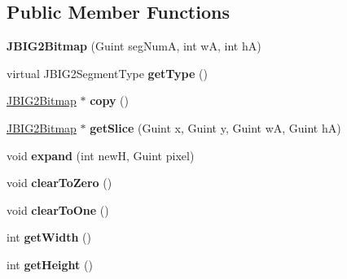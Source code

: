 \subsection*{Public Member Functions}
\begin{DoxyCompactItemize}
\item 
\mbox{\label{class_j_b_i_g2_bitmap_af7a63e73c35e3c62fd77ffe5ddb1dccf}} 
{\bfseries J\+B\+I\+G2\+Bitmap} (Guint seg\+NumA, int wA, int hA)
\item 
\mbox{\label{class_j_b_i_g2_bitmap_ab26ae7c1ba910992c633dd830eee172b}} 
virtual J\+B\+I\+G2\+Segment\+Type {\bfseries get\+Type} ()
\item 
\mbox{\label{class_j_b_i_g2_bitmap_a2f13c130eb777b512c1c8bd844850c84}} 
\hyperlink{class_j_b_i_g2_bitmap}{J\+B\+I\+G2\+Bitmap} $\ast$ {\bfseries copy} ()
\item 
\mbox{\label{class_j_b_i_g2_bitmap_ae009f77d8b4d947d85b9000397bce9d7}} 
\hyperlink{class_j_b_i_g2_bitmap}{J\+B\+I\+G2\+Bitmap} $\ast$ {\bfseries get\+Slice} (Guint x, Guint y, Guint wA, Guint hA)
\item 
\mbox{\label{class_j_b_i_g2_bitmap_aae376357707fb8fe0b6cfecb5cfea193}} 
void {\bfseries expand} (int newH, Guint pixel)
\item 
\mbox{\label{class_j_b_i_g2_bitmap_aa356e2e6bb07cc27b7e5f3c9e7e82e1a}} 
void {\bfseries clear\+To\+Zero} ()
\item 
\mbox{\label{class_j_b_i_g2_bitmap_a0dfebae8091b60f4ec7b63155d2b1bab}} 
void {\bfseries clear\+To\+One} ()
\item 
\mbox{\label{class_j_b_i_g2_bitmap_a7248a97edefd99ddb147380b2b9791e9}} 
int {\bfseries get\+Width} ()
\item 
\mbox{\label{class_j_b_i_g2_bitmap_a7b5fb0a7eb61f5d340dde31acf8c62fb}} 
int {\bfseries get\+Height} ()
\item 
\mbox{\label{class_j_b_i_g2_bitmap_a39618e516b3dfe7de8378a3c943c5589}} 

\end{DoxyCompactItemize}

